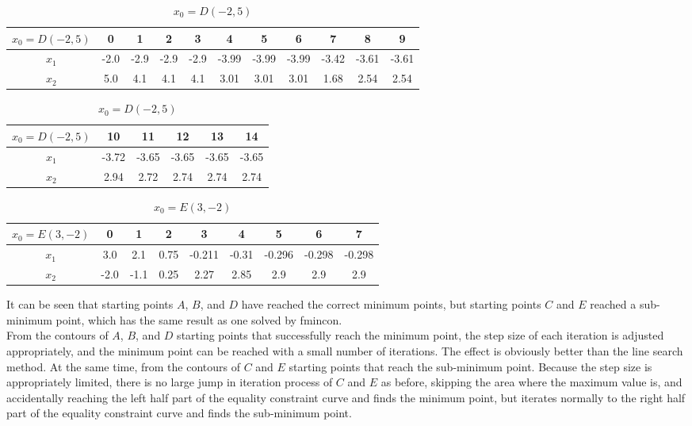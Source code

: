 \begin{table}[H]
\centering
\setlength{\abovecaptionskip}{0cm} 
\setlength{\belowcaptionskip}{-0.5cm} 
\scriptsize
\begin{tabular}{|c|c|c|c|c|c|c|c|c|c|c|}
\hline
$x_0=D(-2,5)$&0&1&2&3&4&5&6&7&8&9\\
\hline
$x_1$&-2.0 & -2.9 & -2.9 & -2.9 & -3.99 & -3.99 & -3.99 & -3.42 & -3.61 & -3.61  \\
\hline
$x_2$&5.0 & 4.1 & 4.1 & 4.1 & 3.01 & 3.01 & 3.01 & 1.68 & 2.54 & 2.54
\\
\hline
\end{tabular}
\begin{tabular}{|c|c|c|c|c|c|}
\hline
$x_0=D(-2,5)$&10&11&12&13&14\\
\hline
$x_1$ &-3.72 & -3.65 & -3.65 & -3.65 & -3.65\\
\hline
$x_2$& 2.94 & 2.72 & 2.74 & 2.74 & 2.74
\\
\hline

\end{tabular}
\caption{$x_0=D(-2,5)$}
\end{table}
\begin{table}[H]
\centering
\setlength{\abovecaptionskip}{0cm} 
\setlength{\belowcaptionskip}{-0.5cm} 
\scriptsize
\begin{tabular}{|c|c|c|c|c|c|c|c|c|}
\hline
$x_0=E(3,-2)$&0&1&2&3&4&5&6&7\\
\hline
$x_1$&3.0 & 2.1 & 0.75 & -0.211 & -0.31 & -0.296 & -0.298 & -0.298 \\
\hline
$x_2$&-2.0 & -1.1 & 0.25 & 2.27 & 2.85 & 2.9 & 2.9 & 2.9
\\
\hline
\end{tabular}

\caption{$x_0=E(3,-2)$}
\end{table}
It can be seen that starting points $A$, $B$, and $D$ have reached the correct minimum points, but starting points $C$ and $E$ reached a sub-minimum point, which has the same result as one solved by fmincon.\\
From the contours of $A$, $B$, and $D$ starting points that successfully reach the minimum point, the step size of each iteration is adjusted appropriately, and the minimum point can be reached with a small number of iterations. The effect is obviously better than the line search method. At the same time, from the contours of $C$ and $E$ starting points that reach the sub-minimum point. Because the step size is appropriately limited, there is no large jump in iteration process of $C$ and $E$ as before, skipping the area where the maximum value is, and accidentally reaching the left half part of the equality constraint curve and finds the minimum point, but iterates normally to the right half part of the equality constraint curve and finds the sub-minimum point.

